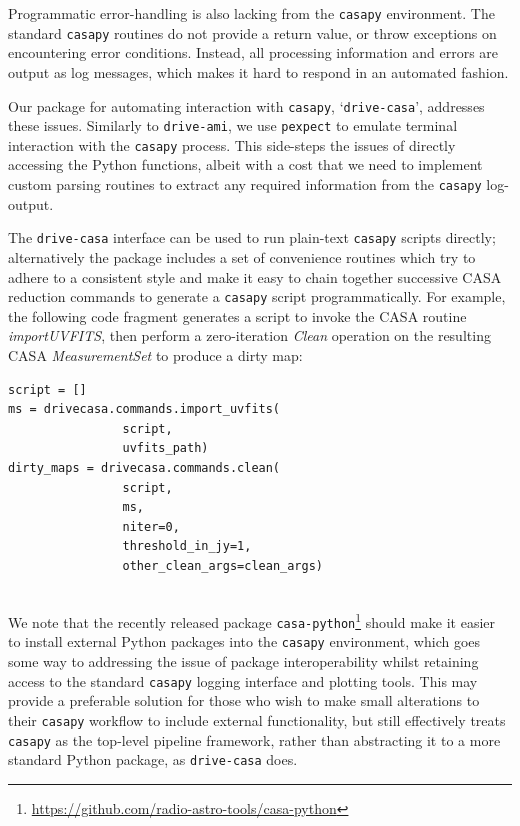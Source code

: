 \documentclass[5p,authoryear]{elsarticle}
\begin{document}
Programmatic error-handling is also lacking from the \texttt{casapy} environment. 
The standard \texttt{casapy} routines do not provide a return value, or throw exceptions on encountering error conditions. 
Instead, all processing information and errors are output as log messages, which makes it hard to respond in an automated fashion.

Our package for automating interaction with \texttt{casapy}, `\texttt{drive-casa}', addresses these issues.
Similarly to \texttt{drive-ami}, we use \texttt{pexpect} to emulate terminal interaction with the \texttt{casapy} process. 
This side-steps the issues of directly accessing the Python functions, albeit with a cost that we need to implement custom parsing routines to extract any required information from the \texttt{casapy} log-output. 

The \texttt{drive-casa} interface can be used to run plain-text \texttt{casapy} scripts directly; alternatively the package includes a set of convenience routines which try to adhere to a consistent style and make it easy to chain together successive CASA reduction commands to generate a \texttt{casapy} script programmatically.
For example, the following code fragment generates a script to invoke the CASA routine \mbox{\textit{importUVFITS}}, then perform a zero-iteration \textit{Clean} operation on the resulting CASA \textit{MeasurementSet}
to produce a dirty map:


\begin{Verbatim}[samepage=true]
script = []
ms = drivecasa.commands.import_uvfits(
                script, 
                uvfits_path)
dirty_maps = drivecasa.commands.clean(
                script, 
                ms, 
                niter=0, 
                threshold_in_jy=1,
                other_clean_args=clean_args)
                
\end{Verbatim}

We note that the recently released package \texttt{casa-python}\footnote{%
\url{https://github.com/radio-astro-tools/casa-python}
}
should make it easier to install external Python packages into the \texttt{casapy} environment, which goes some way to addressing the issue of package interoperability whilst retaining access to the standard \texttt{casapy} logging interface and plotting tools. 
This may provide a preferable solution for those who wish to make small alterations to their \texttt{casapy} workflow to include external functionality, but still effectively treats \texttt{casapy} as the top-level pipeline framework, rather than abstracting it to a more standard Python package, as \texttt{drive-casa} does.
\end{document}
